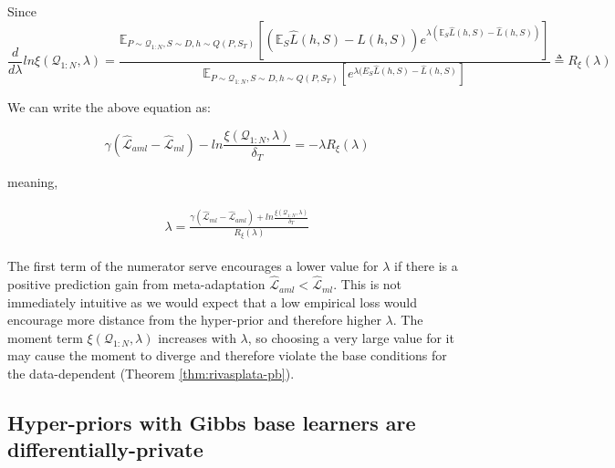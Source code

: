 \documentclass{article}
\theoremstyle{definition}
\newcommand{\Expect}[2]{\mathbb{E}_{#1}\left [#2 \right ]}
\begin{document}
Since 
$$\frac{d}{d\lambda}ln\xi(\mathcal{Q}_{1:N},\lambda)=\frac{\Expect{P\sim \mathcal{Q}_{1:N},S\sim D,h\sim Q(P,S_T)}{(\mathbb{E}_S\hat{L}(h, S)-\hat{L}(h, S))e^{\lambda(\mathbb{E}_S\hat{L}(h, S)-\hat{L}(h, S))} }}{\Expect{P\sim \mathcal{Q}_{1:N},S\sim D,h\sim Q(P,S_T)}{e^{\lambda(E_S\hat{L}(h, S)-\hat{L}(h, S)} }}\triangleq R_\xi(\lambda)$$

We can write the above equation as:

$$\gamma(\hat{\mathcal{L}}_{aml}-\hat{\mathcal{L}}_{ml})-ln\frac{\xi(\mathcal{Q}_{1:N},\lambda)}{\delta_T}=-\lambda R_\xi(\lambda)$$

meaning,

\begin{align} \label{eq:meta-pb-lambda}
\begin{split}
\lambda = \frac{\gamma(\hat{\mathcal{L}}_{ml}-\hat{\mathcal{L}}_{aml})+ln\frac{\xi(\mathcal{Q}_{1:N},\lambda)}{\delta_T}}{R_\xi(\lambda)}
\end{split}
\end{align}

The first term of the numerator serve encourages a lower value for $\lambda$ if there is a positive prediction gain from meta-adaptation $\hat{\mathcal{L}}_{aml}<\hat{\mathcal{L}}_{ml}$. This is not immediately intuitive as we would expect that a low empirical loss would encourage more distance from the hyper-prior and therefore higher $\lambda$. The moment term $\xi(\mathcal{Q}_{1:N}, \lambda)$ increases with $\lambda$, so choosing a very large value for it may cause the moment to diverge and therefore violate the base conditions for the data-dependent (Theorem \ref{thm:rivasplata-pb}). 

%
%
%

\subsection{Hyper-priors with Gibbs base learners are differentially-private} \label{append:proof-dp}
\end{document}
